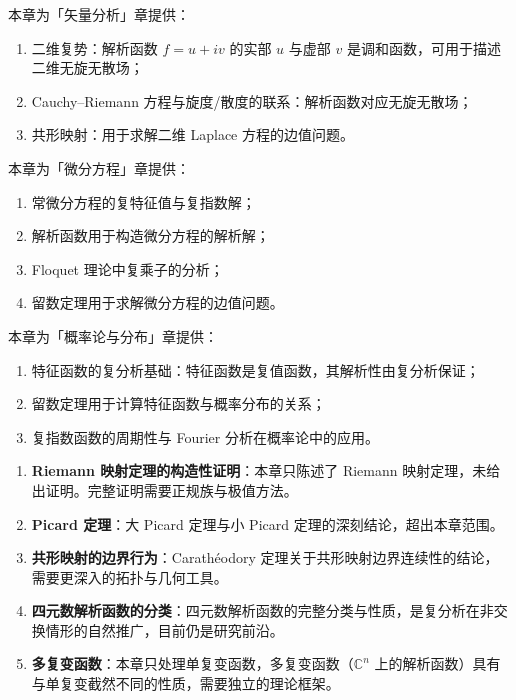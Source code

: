 \begin{remark}\label{rem:ca_to_vector_analysis}
本章为「矢量分析」章提供：
\begin{enumerate}[label=(\roman*)]
    \item 二维复势：解析函数 $f = u + iv$ 的实部 $u$ 与虚部 $v$ 是调和函数，可用于描述二维无旋无散场；
    \item Cauchy--Riemann 方程与旋度/散度的联系：解析函数对应无旋无散场；
    \item 共形映射：用于求解二维 Laplace 方程的边值问题。
\end{enumerate}
\end{remark}

\begin{remark}\label{rem:ca_to_diffeq}
本章为「微分方程」章提供：
\begin{enumerate}[label=(\roman*)]
    \item 常微分方程的复特征值与复指数解；
    \item 解析函数用于构造微分方程的解析解；
    \item Floquet 理论中复乘子的分析；
    \item 留数定理用于求解微分方程的边值问题。
\end{enumerate}
\end{remark}

\begin{remark}\label{rem:ca_to_probability}
本章为「概率论与分布」章提供：
\begin{enumerate}[label=(\roman*)]
    \item 特征函数的复分析基础：特征函数是复值函数，其解析性由复分析保证；
    \item 留数定理用于计算特征函数与概率分布的关系；
    \item 复指数函数的周期性与 Fourier 分析在概率论中的应用。
\end{enumerate}
\end{remark}

\begin{remark}[本章开放问题]\label{rem:ca_open}
\begin{enumerate}[label=(\roman*)]
    \item \textbf{Riemann 映射定理的构造性证明}：本章只陈述了 Riemann 映射定理，未给出证明。完整证明需要正规族与极值方法。
    \item \textbf{Picard 定理}：大 Picard 定理与小 Picard 定理的深刻结论，超出本章范围。
    \item \textbf{共形映射的边界行为}：Carathéodory 定理关于共形映射边界连续性的结论，需要更深入的拓扑与几何工具。
    \item \textbf{四元数解析函数的分类}：四元数解析函数的完整分类与性质，是复分析在非交换情形的自然推广，目前仍是研究前沿。
    \item \textbf{多复变函数}：本章只处理单复变函数，多复变函数（$\mathbb{C}^n$ 上的解析函数）具有与单复变截然不同的性质，需要独立的理论框架。
\end{enumerate}
\end{remark}

